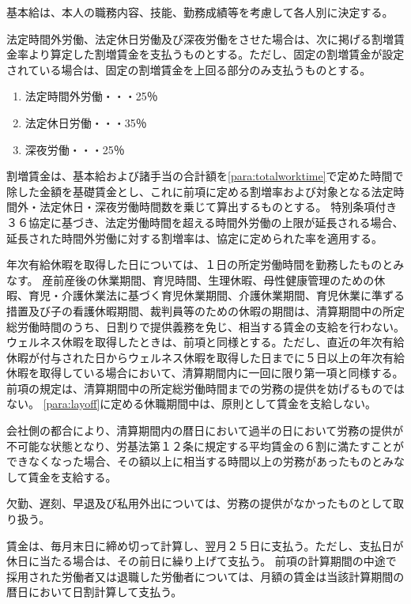 \documentclass[10pt,a4paper,uplatex]{jsarticle}
\begin{document}
基本給は、本人の職務内容、技能、勤務成績等を考慮して各人別に決定する。

法定時間外労働、法定休日労働及び深夜労働をさせた場合は、次に掲げる割増賃金率より算定した割増賃金を支払うものとする。ただし、固定の割増賃金が設定されている場合は、固定の割増賃金を上回る部分のみ支払うものとする。
\begin{enumerate}
    \item 法定時間外労働・・・25％
    \item 法定休日労働・・・35％
    \item 深夜労働・・・25％
\end{enumerate}
\term 割増賃金は、基本給および諸手当の合計額を\ref{para:totalworktime}で定めた時間で除した金額を基礎賃金とし、これに前項に定める割増率および対象となる法定時間外・法定休日・深夜労働時間数を乗じて算出するものとする。
\term 特別条項付き３６協定に基づき、法定労働時間を超える時間外労働の上限が延長される場合、延長された時間外労働に対する割増率は、協定に定められた率を適用する。

年次有給休暇を取得した日については、１日の所定労働時間を勤務したものとみなす。
\term
産前産後の休業期間、育児時間、生理休暇、母性健康管理のための休暇、育児・介護休業法に基づく育児休業期間、介護休業期間、育児休業に準ずる措置及び子の看護休暇期間、裁判員等のための休暇の期間は、清算期間中の所定総労働時間のうち、日割りで提供義務を免じ、相当する賃金の支給を行わない。 
\term 
ウェルネス休暇を取得したときは、前項と同様とする。ただし、直近の年次有給休暇が付与された日からウェルネス休暇を取得した日までに５日以上の年次有給休暇を取得している場合において、清算期間内に一回に限り第一項と同様する。
\term
前項の規定は、清算期間中の所定総労働時間までの労務の提供を妨げるものではない。
\term
\ref{para:layoff}に定める休職期間中は、原則として賃金を支給しない。

会社側の都合により、清算期間内の暦日において過半の日において労務の提供が不可能な状態となり、労基法第１２条に規定する平均賃金の６割に満たすことができなくなった場合、その額以上に相当する時間以上の労務があったものとみなして賃金を支給する。

欠勤、遅刻、早退及び私用外出については、労務の提供がなかったものとして取り扱う。

賃金は、毎月末日に締め切って計算し、翌月２５日に支払う。ただし、支払日が休日に当たる場合は、その前日に繰り上げて支払う。
\term
前項の計算期間の中途で採用された労働者又は退職した労働者については、月額の賃金は当該計算期間の暦日において日割計算して支払う。
\end{document}
